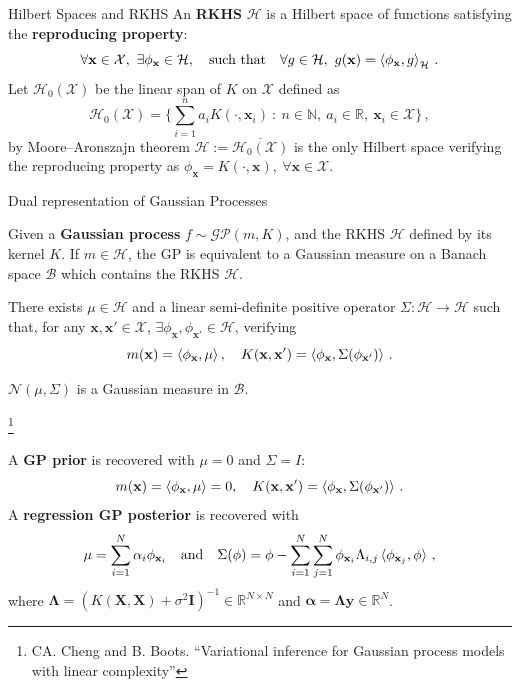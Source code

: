 \documentclass[aspectratio=149]{beamer}
\begin{document}
    \begin{frame}{Hilbert Spaces and RKHS}
        An \textbf{RKHS} \(\mathcal{H}\) is a Hilbert space of functions satisfying the \textbf{reproducing property}: 
        \[
        \forall \mathbf{x} \in \mathcal{X}, \ \exists \phi_{\mathbf{x}} \in \mathcal{H},\quad  \text{such that}\quad \forall g \in \mathcal{H}, \ g(\mathbf{x}) = \braket{\phi_{\mathbf{x}}, g}_\mathcal{H}\,.
        \]
        \pause
         Let \(\mathcal{H}_0(\mathcal{X})\) be the linear span of \(K\) on \(\mathcal{X}\) defined as
        \[
            \mathcal{H}_0(\mathcal{X}) = \Big\{\sum_{i=1}^n a_i K(\cdot, \mathbf{x}_i) \ : \ n \in \mathbb{N}, \ a_i \in \mathbb{R}, \ \mathbf{x}_i \in \mathcal{X}\Big\}\,,
        \]
        by Moore–Aronszajn theorem \(\mathcal{H} := \overline{\mathcal{H}_0(\mathcal{X})}\) is the only Hilbert space verifying the reproducing property as \(\phi_\mathbf{x} = K(\cdot, \mathbf{x}), \ \forall \mathbf{x} \in \mathcal{X}\).
        
                
    \end{frame}
    \begin{frame}{Dual representation of Gaussian Processes}

        Given a \textbf{Gaussian process} \(f\sim \mathcal{GP}(m, K)\), and the RKHS \(\mathcal{H}\) defined by its kernel \(K\). If \(m \in \mathcal{H}\), the GP is equivalent to a Gaussian measure on a Banach space \(\mathcal{B}\) which contains the RKHS \(\mathcal{H}\).
        
        There exists \(\mu \in \mathcal{H}\) and a linear semi-definite positive operator \(\Sigma:\mathcal{H} \to \mathcal{H}\) such that, for any \(\mathbf{x}, \mathbf{x}' \in \mathcal{X}\), \(\exists \phi_{\mathbf{x}}, \phi_{\mathbf{x}'}\in \mathcal{H}\), verifying
        \[
            m(\mathbf{x}) = \braket{\phi_{\mathbf{x}}, \mu}, \quad K(\mathbf{x}, \mathbf{x}') = \braket{\phi_{\mathbf{x}}, \Sigma(\phi_{\mathbf{x}'})}\,.
        \]
        \begin{center}
        \(\mathcal{N}(\mu, \Sigma)\) is a Gaussian measure in \(\mathcal{B}\).
        \end{center}
    {\let\thefootnote\relax\footnote{{CA. Cheng and B. Boots. ``Variational inference for Gaussian process models with linear complexity''}}}
    \end{frame}

    \begin{frame}
        A \textbf{\color{orange}GP prior} is recovered with \(\mu = 0\) and \(\Sigma = I\):
        \[
            m(\mathbf{x}) = \braket{\phi_{\mathbf{x}}, \mu} = 0, \quad K(\mathbf{x}, \mathbf{x}') = \braket{\phi_{\mathbf{x}}, \Sigma(\phi_{\mathbf{x}'})}\,.
        \]
        \pause
        A \textbf{\color{orange}regression GP posterior} is recovered with 
        \[
            \mu = \sum_{i=1}^N \alpha_i \phi_{\mathbf{x}_i} \quad \text{and} \quad \Sigma(\phi)= \phi - \sum_{i=1}^N \sum_{j=1}^N \phi_{\mathbf{x}_i} \Lambda_{i,j} \braket{\phi_{\mathbf{x}_j}, \phi}\,,
        \]
        where \(\bm{\Lambda} = (K(\mathbf{X}, \mathbf{X}) + \sigma^2 \bm{I})^{-1} \in \mathbb{R}^{N \times N}\) and \(\bm{\alpha} = \bm{\Lambda}\bm{y} \in \mathbb{R}^N\).
    \end{frame}
\end{document}
